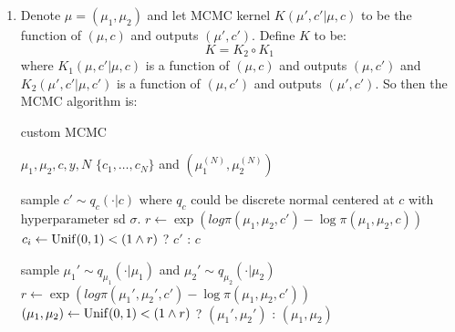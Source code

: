 \documentclass{article}
\begin{document}



\begin{enumerate}
\item 
Denote $\mu = (\mu_1, \mu_2)$ and let MCMC kernel $K(\mu', c' | \mu, c)$ to be the function of $(\mu, c)$ and outputs $(\mu', c')$. Define $K$  to be:
\[K = K_2 \circ K_1\]where $K_1(\mu, c' |\mu, c)$ is a function of $(\mu, c)$ and outputs $(\mu, c')$ and $K_2(\mu', c' | \mu, c')$ is a function of $(\mu, c')$ and outputs $(\mu', c')$. So then the MCMC algorithm is:
\begin{algorithm}
    \caption{custom MCMC}
    \label{algo:mixture}
    \begin{algorithmic}[1]
        \Require $\mu_1, \mu_2, c, y, N$
        \Ensure $\{c_1, \ldots, c_N\}$ and $(\mu_1^{(N)}, \mu_2^{(N)})$

        \State sample $c' \sim q_c( \cdot | c)$ where $q_c$ could be discrete normal centered at $c$ with hyperparameter sd $\sigma$.
        \State $r \leftarrow \exp(log\pi(\mu_1, \mu_2, c') - \log\pi(\mu_1, \mu_2, c))$
        \State $c_i \leftarrow \operatorname{Unif}(0,1) < (1 \wedge r)$ ? $c'$ : $c$

        \State sample $\mu_1' \sim q_{\mu_1}(\cdot | \mu_1)$ and $\mu_2' \sim q_{\mu_2}(\cdot | \mu_2)$
        \State $r \leftarrow \exp(log\pi(\mu_1', \mu_2', c') - \log\pi(\mu_1, \mu_2, c'))$
        \State $(\mu_1, \mu_2) \leftarrow \operatorname{Unif}(0,1) < (1 \wedge r)$ ? $(\mu_1', \mu_2')$ : $(\mu_1, \mu_2)$


        \EndFor
    \end{algorithmic}

\end{algorithm}




\end{enumerate}
\end{document}

